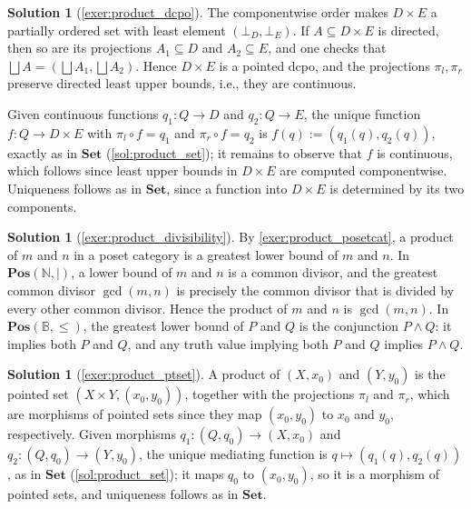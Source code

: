 \documentclass[a4paper,11pt, oneside,titlepage=false]{scrbook}
\theoremstyle{plain}
\theoremstyle{definition}
\newtheorem{solution}[thm]{Solution}
\newcommand{\Catb}[1]{\mathbf{#1}}
\newcommand{\SET}{\Catb{Set}}
\newcommand{\POS}{\Catb{Pos}}
\newcommand{\projl}{\ensuremath{\pi_l}}
\newcommand{\projr}{\ensuremath{\pi_r}}
\newcommand{\co}[2]{\ensuremath{#2 \circ #1}}
\newcommand{\NN}{\ensuremath{\mathbb{N}}}
\begin{document}
\begin{solution}[\cref{exer:product_dcpo}]\label{sol:product_dcpo}
  The componentwise order makes $D \times E$ a partially ordered set with least
  element $(\bot_D, \bot_E)$.
  If $A \subseteq D \times E$ is directed, then so are its projections
  $A_1 \subseteq D$ and $A_2 \subseteq E$, and one checks that
  $\bigsqcup A = (\bigsqcup A_1, \bigsqcup A_2)$.
  Hence $D \times E$ is a pointed dcpo, and the projections $\projl, \projr$
  preserve directed least upper bounds, i.e., they are continuous.

  Given continuous functions $q_1 : Q \to D$ and $q_2 : Q \to E$, the unique
  function $f : Q \to D \times E$ with $\co{f}{\projl} = q_1$ and
  $\co{f}{\projr} = q_2$ is $f(q) := (q_1(q), q_2(q))$, exactly as in $\SET$
  (\cref{sol:product_set}); it remains to observe that $f$ is continuous, which
  follows since least upper bounds in $D \times E$ are computed componentwise.
  Uniqueness follows as in $\SET$, since a function into $D\times E$ is
  determined by its two components.
\end{solution}

\begin{solution}[\cref{exer:product_divisibility}]\label{sol:product_divisibility}
  By \cref{exer:product_posetcat}, a product of $m$ and $n$ in a poset category
  is a greatest lower bound of $m$ and $n$.
  In $\POS(\NN,\mid)$, a lower bound of $m$ and $n$ is a common divisor, and
  the greatest common divisor $\gcd(m,n)$ is precisely the common divisor that
  is divided by every other common divisor.
  Hence the product of $m$ and $n$ is $\gcd(m,n)$.
  In $\POS(\mathbb{B},\leq)$, the greatest lower bound of $P$ and $Q$ is the
  conjunction $P \wedge Q$: it implies both $P$ and $Q$, and any truth value
  implying both $P$ and $Q$ implies $P \wedge Q$.
\end{solution}

\begin{solution}[\cref{exer:product_ptset}]\label{sol:product_ptset}
  A product of $(X,x_0)$ and $(Y,y_0)$ is the pointed set
  $(X \times Y, (x_0,y_0))$, together with the projections $\projl$ and
  $\projr$, which are morphisms of pointed sets since they map $(x_0,y_0)$ to
  $x_0$ and $y_0$, respectively.
  Given morphisms $q_1 : (Q,q_0) \to (X,x_0)$ and $q_2 : (Q,q_0) \to (Y,y_0)$,
  the unique mediating function is $q \mapsto (q_1(q), q_2(q))$, as in $\SET$
  (\cref{sol:product_set}); it maps $q_0$ to $(x_0,y_0)$, so it is a morphism
  of pointed sets, and uniqueness follows as in $\SET$.
\end{solution}
\end{document}
